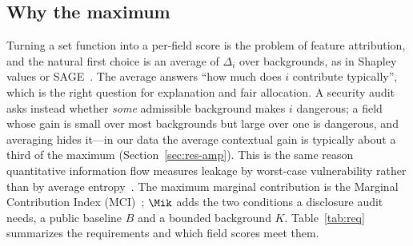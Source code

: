\subsection{Why the maximum}
Turning a set function into a per-field score is the problem of feature attribution, and the
natural first choice is an average of $\Delta_i$ over backgrounds, as in Shapley values or
SAGE~\cite{covert2020sage}. The average answers ``how much does $i$ contribute typically'', which is
the right question for explanation and fair allocation. A security audit asks instead whether
\emph{some} admissible background makes $i$ dangerous; a field whose gain is small over most
backgrounds but large over one is dangerous, and averaging hides it---in our data the average
contextual gain is typically about a third of the maximum (Section~\ref{sec:res-amp}). This is the
same reason quantitative information flow measures leakage by worst-case
vulnerability rather than by average entropy~\cite{smith2009qif,alvim2012gleakage}. The maximum
marginal contribution is the Marginal Contribution Index (MCI)~\cite{catav2021mci}; $\Mik$ adds the
two conditions a disclosure audit needs, a public baseline $B$ and a bounded background $K$.
Table~\ref{tab:req} summarizes the requirements and which field scores meet them.

\begin{table}[!tbp]
\centering\small
\caption{Requirements for a field-level inference-risk quantity. \checkmark: satisfied;
$\circ$: partially; --: not satisfied.}\label{tab:req}
\end{table}

